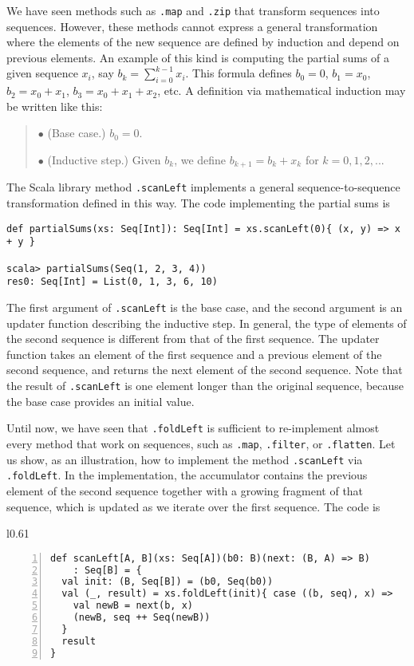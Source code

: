 We have seen methods such as \lstinline!.map! and \lstinline!.zip!
that transform sequences into sequences. However, these methods cannot
express a general transformation where the elements of the new sequence
are defined by induction and depend on previous elements. An example
of this kind is computing the partial sums of a given sequence $x_{i}$,
say $b_{k}=\sum_{i=0}^{k-1}x_{i}$. This formula defines $b_{0}=0$,
$b_{1}=x_{0}$, $b_{2}=x_{0}+x_{1}$, $b_{3}=x_{0}+x_{1}+x_{2}$,
etc. A definition via mathematical induction may be written like this:
\begin{quotation}
$\bullet$ (Base case.) $b_{0}=0$.

$\bullet$ (Inductive step.) Given $b_{k}$, we define $b_{k+1}=b_{k}+x_{k}$
for $k=0,1,2,...$
\end{quotation}
The Scala library method \lstinline!.scanLeft! implements a general
sequence-to-sequence transformation defined in this way. The code
implementing the partial sums is
\begin{lstlisting}
def partialSums(xs: Seq[Int]): Seq[Int] = xs.scanLeft(0){ (x, y) => x + y }

scala> partialSums(Seq(1, 2, 3, 4))
res0: Seq[Int] = List(0, 1, 3, 6, 10)
\end{lstlisting}
The first argument of \lstinline!.scanLeft! is the base case, and
the second argument is an updater function describing the inductive
step. In general, the type of elements of the second sequence is different
from that of the first sequence. The updater function takes an element
of the first sequence and a previous element of the second sequence,
and returns the next element of the second sequence. Note that the
result of \lstinline!.scanLeft! is one element longer than the original
sequence, because the base case provides an initial value.

Until now, we have seen that \lstinline!.foldLeft! is sufficient
to re-implement almost every method that work on sequences, such as
\lstinline!.map!, \lstinline!.filter!, or \lstinline!.flatten!.
Let us show, as an illustration, how to implement the method \lstinline!.scanLeft!
via \lstinline!.foldLeft!. In the implementation, the accumulator
contains the previous element of the second sequence together with
a growing fragment of that sequence, which is updated as we iterate
over the first sequence. The code is

\begin{wrapfigure}{l}{0.61\columnwidth}%
\vspace{-0.95\baselineskip}
\begin{lstlisting}[numbers=left,numberstyle={\small}]
def scanLeft[A, B](xs: Seq[A])(b0: B)(next: (B, A) => B)
    : Seq[B] = {
  val init: (B, Seq[B]) = (b0, Seq(b0))
  val (_, result) = xs.foldLeft(init){ case ((b, seq), x) =>
    val newB = next(b, x)
    (newB, seq ++ Seq(newB))
  }
  result
}
\end{lstlisting}

\vspace{-1.2\baselineskip}
\end{wrapfigure}%

